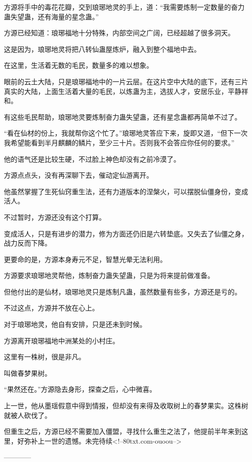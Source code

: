 \begin{this_body}
方源将手中的毒花花瓣，交到琅琊地灵的手上，道：“我需要炼制一定数量的奋力蛊失望蛊，还有海量的星念蛊。”

方源已经知道：琅琊福地十分特殊，内部空间之广阔，已经超越了很多洞天。

这是因为，琅琊地灵将把八转仙蛊屋炼炉，融入到整个福地中去。

在这里，生活着无数的毛民，数量多的难以想象。

眼前的云土大陆，只是琅琊福地中的一片云层。在这片空中大陆的底下，还有三片真实的大陆，上面生活着大量的毛民，以炼蛊为主，选拔人才，安居乐业，平静祥和。

有这些毛民帮助，琅琊地灵要炼制奋力蛊失望蛊，还有星念蛊都再简单不过了。

“看在仙材的份上，我就帮你这个忙了。”琅琊地灵答应下来，旋即又道，“但下一次我希望能看到半月麒麟的鳞片，至少三十片。否则我不会答应你任何的要求。”

他的语气还是比较生硬，不过脸上神色却没有之前冷漠了。

方源点点头，没有再深聊下去，催动定仙游离开。

他虽然掌握了生死仙窍重生法，还有力道版本的涅槃火，可以摆脱仙僵身份，变成活人。

不过暂时，方源还没有这个打算。

变成活人，只是有进步的潜力，修为方面还仍旧是六转垫底。又失去了仙僵之身，战力反而下降。

更要命的是，方源本身寿元不足，智慧光晕无法利用。

方源要求琅琊地灵帮他，炼制奋力蛊失望蛊，只是为将来提前做准备。

但他付出的是仙材，琅琊地灵只是炼制凡蛊，虽然数量有些多，方源还是亏的。

不过这点，方源并不放在心上。

对于琅琊地灵，他自有安排，只是还未到时候。

方源离开琅琊福地中洲某处的小村庄。

这里有一株树，很是非凡。

叫做春梦果树。

“果然还在。”方源隐去身形，探查之后，心中微喜。

上一世，他从墨瑶假意中得到情报，但却没有来得及收取树上的春梦果实。这株树就被人砍伐了。

但重生之后，方源已经不需要加入僵盟，寻找什么重生之法了，他提前半年来到这里，好弥补上一世的遗憾。未完待续<!--80txt.com-ouoou-->

------------

\end{this_body}

